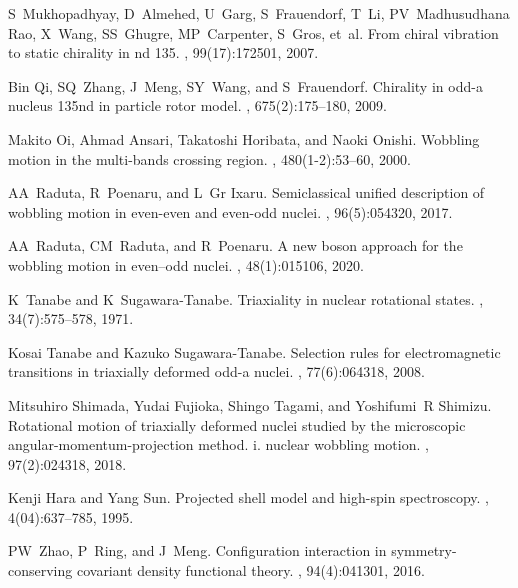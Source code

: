 \documentclass[11pt]{article}
\begin{document}
\begin{thebibliography}{99}
S~Mukhopadhyay, D~Almehed, U~Garg, S~Frauendorf, T~Li, PV~Madhusudhana Rao,
  X~Wang, SS~Ghugre, MP~Carpenter, S~Gros, et~al.
\newblock From chiral vibration to static chirality in nd 135.
, 99(17):172501, 2007.

Bin Qi, SQ~Zhang, J~Meng, SY~Wang, and S~Frauendorf.
\newblock Chirality in odd-a nucleus 135nd in particle rotor model.
, 675(2):175--180, 2009.

Makito Oi, Ahmad Ansari, Takatoshi Horibata, and Naoki Onishi.
\newblock Wobbling motion in the multi-bands crossing region.
, 480(1-2):53--60, 2000.

AA~Raduta, R~Poenaru, and L~Gr Ixaru.
\newblock Semiclassical unified description of wobbling motion in even-even and
  even-odd nuclei.
, 96(5):054320, 2017.

AA~Raduta, CM~Raduta, and R~Poenaru.
\newblock A new boson approach for the wobbling motion in even--odd nuclei.
,
  48(1):015106, 2020.

K~Tanabe and K~Sugawara-Tanabe.
\newblock Triaxiality in nuclear rotational states.
, 34(7):575--578, 1971.

Kosai Tanabe and Kazuko Sugawara-Tanabe.
\newblock Selection rules for electromagnetic transitions in triaxially
  deformed odd-a nuclei.
, 77(6):064318, 2008.

Mitsuhiro Shimada, Yudai Fujioka, Shingo Tagami, and Yoshifumi~R Shimizu.
\newblock Rotational motion of triaxially deformed nuclei studied by the
  microscopic angular-momentum-projection method. i. nuclear wobbling motion.
, 97(2):024318, 2018.

Kenji Hara and Yang Sun.
\newblock Projected shell model and high-spin spectroscopy.
, 4(04):637--785,
  1995.

PW~Zhao, P~Ring, and J~Meng.
\newblock Configuration interaction in symmetry-conserving covariant density
  functional theory.
, 94(4):041301, 2016.


\end{thebibliography}
\end{document}

